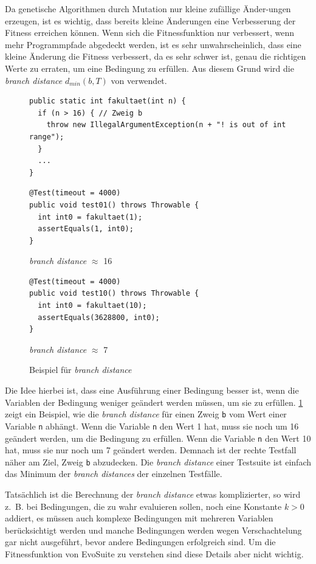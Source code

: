 \documentclass[a4paper,11pt]{article}
\begin{document}
Da genetische Algorithmen durch Mutation nur kleine zufällige Änder-ungen erzeugen, ist es wichtig, dass bereits kleine Änderungen eine Verbesserung der Fitness erreichen können.
Wenn sich die Fitnessfunktion nur verbessert, wenn mehr Programmpfade abgedeckt werden, ist es sehr unwahrscheinlich, dass eine kleine Änderung die Fitness verbessert, da es sehr schwer ist, genau die richtigen Werte zu erraten, um eine Bedingung zu erfüllen.
Aus diesem Grund wird die \textit{branch distance} $d_{min}(b, T)$ von \citet{10.1109/32.57624} verwendet.

\begin{figure}[h]
	\begin{lstlisting}[basicstyle=\ttfamily\tiny]
public static int fakultaet(int n) {
  if (n > 16) { // Zweig b
    throw new IllegalArgumentException(n + "! is out of int range");
  }
  ...
}
	\end{lstlisting}
	\begin{multicols}{2}
		\begin{lstlisting}[basicstyle=\ttfamily\tiny]
@Test(timeout = 4000)
public void test01() throws Throwable {
  int int0 = fakultaet(1);
  assertEquals(1, int0);
}
		\end{lstlisting}
		\textit{branch distance} $\approx$ 16
		\columnbreak
		\begin{lstlisting}[basicstyle=\ttfamily\tiny]
@Test(timeout = 4000)
public void test10() throws Throwable {
  int int0 = fakultaet(10);
  assertEquals(3628800, int0);
}
		\end{lstlisting}
		\textit{branch distance} $\approx$ 7
	\end{multicols}
	\caption{Beispiel für \textit{branch distance}}
	\label{fig:branch_distance}
\end{figure}

Die Idee hierbei ist, dass eine Ausführung einer Bedingung besser ist, wenn die Variablen der Bedingung weniger geändert werden müssen, um sie zu erfüllen.
\cref{fig:branch_distance} zeigt ein Beispiel, wie die \textit{branch distance} für einen Zweig \texttt{b} vom Wert einer Variable \texttt{n} abhängt.
Wenn die Variable \texttt{n} den Wert 1 hat, muss sie noch um 16 geändert werden, um die Bedingung zu erfüllen.
Wenn die Variable \texttt{n} den Wert 10 hat, muss sie nur noch um 7 geändert werden.
Demnach ist der rechte Testfall näher am Ziel, Zweig \texttt{b} abzudecken.
Die \textit{branch distance} einer Testsuite ist einfach das Minimum der \textit{branch distances} der einzelnen Testfälle.

Tatsächlich ist die Berechnung der \textit{branch distance} etwas komplizierter, so wird z.~B. bei Bedingungen, die zu wahr evaluieren sollen, noch eine Konstante $k > 0$ addiert, es müssen auch komplexe Bedingungen mit mehreren Variablen berücksichtigt werden und manche Bedingungen werden wegen Verschachtelung gar nicht ausgeführt, bevor andere Bedingungen erfolgreich sind.
Um die Fitnessfunktion von EvoSuite zu verstehen sind diese Details aber nicht wichtig.
\end{document}
